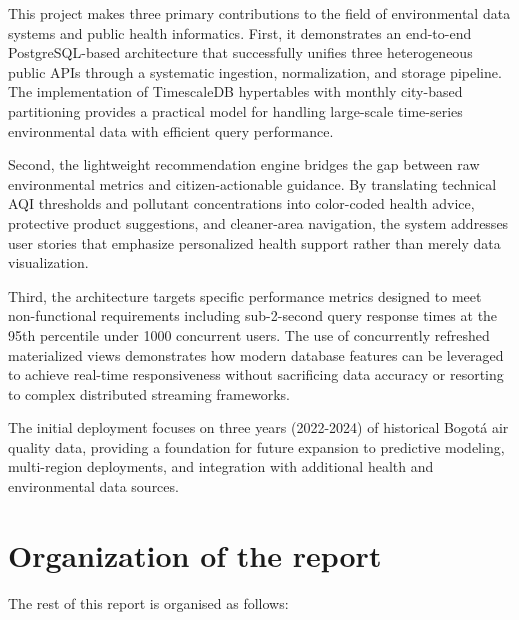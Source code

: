 This project makes three primary contributions to the field of environmental data systems and public health informatics. First, it demonstrates an end-to-end PostgreSQL-based architecture that successfully unifies three heterogeneous public APIs through a systematic ingestion, normalization, and storage pipeline. The implementation of TimescaleDB hypertables with monthly city-based partitioning provides a practical model for handling large-scale time-series environmental data with efficient query performance.

Second, the lightweight recommendation engine bridges the gap between raw environmental metrics and citizen-actionable guidance. By translating technical AQI thresholds and pollutant concentrations into color-coded health advice, protective product suggestions, and cleaner-area navigation, the system addresses user stories that emphasize personalized health support rather than merely data visualization.

Third, the architecture targets specific performance metrics designed to meet non-functional requirements including sub-2-second query response times at the 95th percentile under 1000 concurrent users. The use of concurrently refreshed materialized views demonstrates how modern database features can be leveraged to achieve real-time responsiveness without sacrificing data accuracy or resorting to complex distributed streaming frameworks.

The initial deployment focuses on three years (2022-2024) of historical Bogotá air quality data, providing a foundation for future expansion to predictive modeling, multi-region deployments, and integration with additional health and environmental data sources.

\section{Organization of the report}
\label{sec:intro_org}

The rest of this report is organised as follows:

